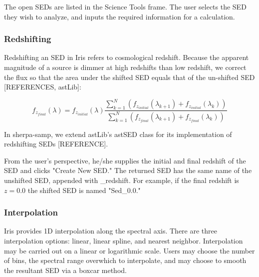 The open SEDs are listed in the Science Tools frame. The user selects the SED they wish to analyze, and inputs the required information for a calculation.

\subsubsection{Redshifting}
Redshifting an SED in Iris refers to cosmological redshift. Because the apparent magnitude of a source is dimmer at high redshifts than low redshift, we correct the flux so that the area under the shifted SED equals that of the un-shifted SED [REFERENCES, astLib]:

\[f_{z_{final}}(\lambda) = f_{z_{initial}}(\lambda) \frac{\sum_{k=1}^N (f_{z_{initial}}(\lambda_{k+1})+f_{z_{initial}}(\lambda_{k}))}{\sum_{k=1}^N (f_{z_{final}}(\lambda_{k+1})+f_{z_{final}}(\lambda_{k}))}\]

In sherpa-samp, we extend astLib's astSED class for its implementation of redshifting SEDs [REFERENCE]. 

From the user's perspective, he/she supplies the initial and final redshift of the SED and clicks "Create New SED." The returned SED has the same name of the unshifted SED, appended with _redshift. For example, if the final redshift is \(z=0.0\) the shifted SED is named "Sed\_0.0."

\subsubsection{Interpolation}
Iris provides 1D interpolation along the spectral axis. There are three interpolation options: linear, linear spline, and nearest neighbor. Interpolation may be carried out on a linear or logarithmic scale. Users may choose the number of bins, the spectral range overwhich to interpolate, and may choose to smooth the resultant SED via a boxcar method.

